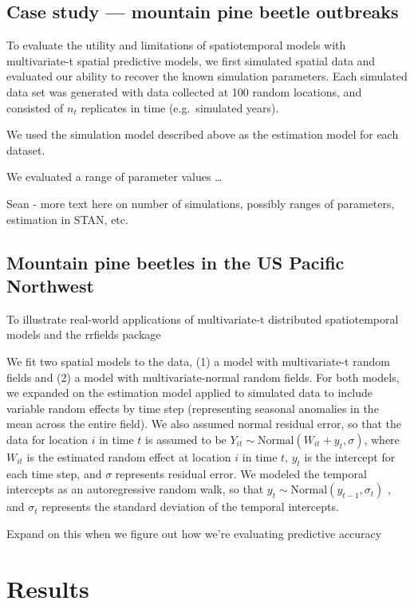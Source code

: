 \documentclass[12pt,english]{article}
\begin{document}
\begin{spacing}{1.25}
\subsection{Case study --- mountain pine beetle outbreaks}

To evaluate the utility and limitations of spatiotemporal models with
multivariate-t spatial predictive models, we first simulated spatial data and
evaluated our ability to recover the known simulation parameters. Each
simulated data set was generated with data collected at 
100 random locations, and consisted of
$n_t$ replicates in time (e.g.~simulated years). 

We used the simulation model described above as the estimation model for each
dataset.

We evaluated a range of parameter values \ldots

Sean - more text here on number of simulations, possibly ranges of
parameters, estimation in STAN, etc.

\subsection{Mountain pine beetles in the US Pacific Northwest}

To illustrate real-world applications of multivariate-t distributed
spatiotemporal models and the rrfields package

We fit two spatial models to the data, (1) a model with
multivariate-t random fields and (2) a model with multivariate-normal random
fields. For both models, we expanded on the estimation model applied to
simulated data to include variable random effects by time step (representing
seasonal anomalies in the mean across the entire field). We also assumed normal
residual error, so that the data for location $i$ in time $t$ is
assumed to be 
$Y_{it}\sim \mathrm{Normal}\left(W_{it}+y_t, \sigma \right)$, 
where $W_{it}$ is the estimated random effect
at location $i$ in time $t$, $y_t$ is the intercept for each time
step, and $\sigma$ represents residual error. 
We modeled the temporal intercepts as an autoregressive random walk, 
so that 
$y_t\sim \mathrm{Normal}\left( y_{t-1},\sigma_t \right)$ , and
$\sigma_t$ represents the standard deviation of the temporal intercepts.

Expand on this when we figure out how we're evaluating predictive accuracy

\section{Results}


\end{spacing}
\end{document}
